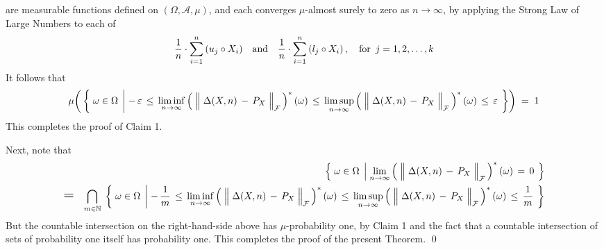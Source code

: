 are measurable functions defined on $(\Omega,\mathcal{A},\mu)$, and
each converges $\mu$-almost surely to zero as $n \longrightarrow \infty$,
by applying the Strong Law of Large Numbers to each of
\begin{equation*}
\dfrac{1}{n}\cdot \overset{n}{\underset{i=1}{\sum}}\,(u_{j} \circ X_{i})
\quad\textnormal{and}\quad
\dfrac{1}{n}\cdot \overset{n}{\underset{i=1}{\sum}}\,(l_{j} \circ X_{i})\,,
\quad\textnormal{for \,$j = 1, 2, \ldots, k$}
\end{equation*}
It follows that
\begin{equation*}
\mu\!\left(\,\left\{\;
	\omega\in\Omega
\;\left\vert\;
	-\,\varepsilon
	\,\leq\,
	\underset{n\rightarrow\infty}{\liminf}
	\left(\;\left\Vert\;\Delta(X,n) \,\overset{{\color{white}.}}{-}\, P_{X}\;\right\Vert_{\mathcal{F}}\,\right)^{*}(\omega)
	\,\leq\,
	\underset{n\rightarrow\infty}{\limsup}
	\left(\;\left\Vert\;\Delta(X,n) \,\overset{{\color{white}.}}{-}\, P_{X}\;\right\Vert_{\mathcal{F}}\,\right)^{*}(\omega)
	\,\leq\,
	\varepsilon
\right.
\;\right\}\right)
\;=\; 1
\end{equation*}
This completes the proof of Claim 1.

\vskip 0.3cm
\noindent
Next, note that
\begin{eqnarray*}
&&
	\left\{\;
		\omega\in\Omega
	\;\left\vert\;
		\underset{n\rightarrow\infty}{\lim}
		\left(\;\left\Vert\;\Delta(X,n) \,\overset{{\color{white}.}}{-}\, P_{X}\;\right\Vert_{\mathcal{F}}\,\right)^{*}(\omega)
		\,=\,
		0
	\right.
	\;\right\}
\\
& \mathlarger{\mathlarger{=}} &
	\underset{m\in\N}{\bigcap}\;
	\left\{\;
		\omega\in\Omega
	\;\left\vert\;
		-\,\dfrac{1}{m}
		\,\leq\,
		\underset{n\rightarrow\infty}{\liminf}
		\left(\;\left\Vert\;\Delta(X,n) \,\overset{{\color{white}.}}{-}\, P_{X}\;\right\Vert_{\mathcal{F}}\,\right)^{*}(\omega)
		\,\leq\,
		\underset{n\rightarrow\infty}{\limsup}
		\left(\;\left\Vert\;\Delta(X,n) \,\overset{{\color{white}.}}{-}\, P_{X}\;\right\Vert_{\mathcal{F}}\,\right)^{*}(\omega)
		\,\leq\,
		\dfrac{1}{m}
	\right.
	\;\right\}
\end{eqnarray*}
But the countable intersection on the right-hand-side above has $\mu$-probability one,
by Claim 1 and the fact that a countable intersection of sets of probability one itself has probability one.
This completes the proof of the present Theorem.
\qed



\renewcommand{\theenumi}{\roman{enumi}}
\renewcommand{\labelenumi}{\textnormal{(\theenumi)}$\;\;$}

